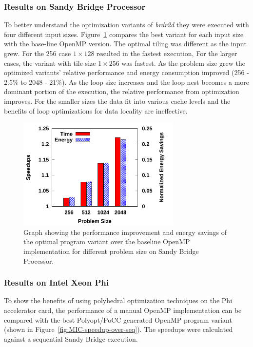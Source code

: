 \subsubsection{Results on Sandy Bridge Processor}

To better understand the optimization variants of \emph {brdr2d}
they were executed with four different input sizes. Figure~\ref{fig:speedup}
compares the best variant for each input size
with the base-line OpenMP version. The optimal tiling was different as the
input grew. For the 256 case $1\times128$ resulted in the fastest
execution, For the larger cases, the variant with tile size $1\times256$ was 
fastest. As the problem size grew the optimized variants' relative performance and
energy consumption improved (256 - $2.5\%$ to 2048 - $21\%$). As the loop size
increases and the loop nest becomes a more dominant portion of the execution,
the relative performance from optimization improves.
For the smaller sizes the data fit into various cache levels and the 
benefits of loop optimizations for data locality are ineffective.

\begin{figure}[bt]
    \includegraphics[width=3.2in]{speedup}
    \caption{Graph showing the performance improvement and energy savings of 
the optimal program variant over the baseline OpenMP implementation for 
different problem size on Sandy Bridge Processor.} 
    \label{fig:speedup}
\end{figure}

\subsubsection{Results on Intel Xeon Phi}
To show the benefits of using polyhedral optimization techniques on the Phi
accelerator card, the performance of a manual OpenMP implementation 
can be compared with the best Polyopt/PoCC generated OpenMP program variant (shown in Figure~\ref{fig:MIC-speedup-over-seq}).
The speedups were calculated against a sequential Sandy Bridge execution.

